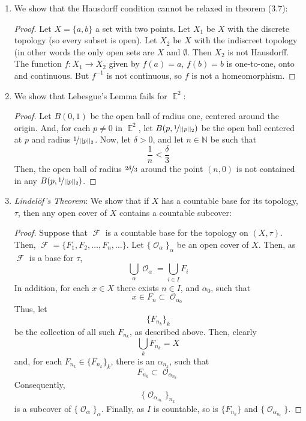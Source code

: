 \documentclass{book}
\DeclareMathOperator*{\E}{\mathbb{E}}
\DeclareMathOperator*{\Ocal}{\mathcal{O}}
\DeclareMathOperator*{\F}{\mathcal{F}}
\begin{document}
\begin{enumerate}[(1)]
    \item We show that the Hausdorff condition cannot be relaxed in theorem ($3.7$): 
        \begin{proof} Let $X=\{a,b\}$ a set with two points.  Let $X_1$ be $X$ with the discrete topology (so every subset is open).  Let $X_2$ be $X$ with the indiscreet topology (in other words the only open sets are $X$ and $\emptyset$.  Then $X_2$ is not Hausdorff.  The function $f:X_1\rightarrow X_2$ given by $f(a)=a$, $f(b)=b$ is one-to-one, onto and continuous.  But $f^{-1}$ is not continuous, so $f$ is not a homeomorphism.
        \end{proof}

    \item We show that Lebesgue's Lemma fails for $\E^2$: 
        \begin{proof}Let $B(0,1)$ be the open ball of radius one, centered around the origin. And, for each $p \neq 0$ in $\E^2$, let $B(p, \nicefrac{1}{||p||_2})$ be the open ball centered at $p$ and radius $\nicefrac{1}{||p||_2}$. Now, let $\delta > 0$, and let $n \in \mathbb{N}$ be such that 
            \[\frac{1}{n} < \frac{\delta}{3}\]
            Then, the open ball of radius $\nicefrac{2 \delta}{3}$ around the point $(n,0)$ is not contained in any $B(p, \nicefrac{1}{||p||_2})$. 
        \end{proof}

    \item \textit{Lindel{\"o}f's Theorem}: We show that if $X$ has a countable base for its topology, $\tau$, then any open cover of $X$ contains a countable subcover: 
        \begin{proof} Suppose that $\F$ is a countable base for the topology on $(X, \tau)$. Then, $\F = \{F_1, F_2, \dots, F_n, \dots \}$. Let $\{\Ocal_\alpha \}_\alpha$ be an open cover of $X$. Then, as $\F$ is a base for $\tau$, 
            \[\bigcup_\alpha \Ocal_\alpha = \bigcup_{i \in I} F_i\]
            In addition, for each $x \in X$ there exists $n \in I$, and $\alpha_0$, such that 
            \[x \in F_n \subset \Ocal_{\alpha_0}\]
            Thus, let 
            \[\{F_{n_k}\}_k\]
            be the collection of all such $F_{n_k}$, as described above. Then, clearly 
            \[\bigcup_k F_{n_k} = X\]
            and, for each $F_{n_k} \in \{F_{n_k}\}_k$, there is an $\alpha_{n_k}$, such that 
            \[F_{n_k} \subset \Ocal_{\alpha_{n_k}}\]
            Consequently, 
            \[\{ \Ocal_{\alpha_{n_k}} \}_{n_k} \]
            is a subcover of $\{\Ocal_\alpha \}_\alpha$. 
            Finally, as $I$ is countable, so is $\{F_{n_k}\}$ and $\{ \Ocal_{\alpha_{n_k}} \}$.
        \end{proof}


\end{enumerate}
\end{document}
